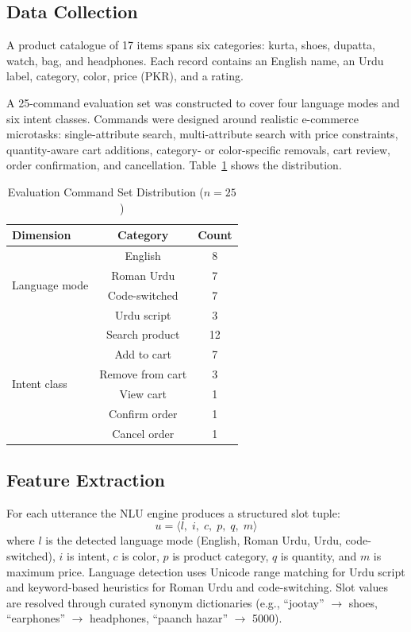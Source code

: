 \documentclass[conference]{IEEEtran}
\begin{document}
\subsection{Data Collection}

A product catalogue of 17 items spans six categories: kurta, shoes,
dupatta, watch, bag, and headphones. Each record contains an English
name, an Urdu label, category, color, price (PKR), and a rating.

A 25-command evaluation set was constructed to cover four language
modes and six intent classes. Commands were designed around realistic
e-commerce microtasks: single-attribute search, multi-attribute search
with price constraints, quantity-aware cart additions, category- or
color-specific removals, cart review, order confirmation, and
cancellation. Table~\ref{tab:commands} shows the distribution.

\begin{table}[t]
\caption{Evaluation Command Set Distribution ($n=25$)}
\label{tab:commands}
\centering
\renewcommand{\arraystretch}{1.1}
\begin{tabular}{lcc}
\toprule
\textbf{Dimension} & \textbf{Category} & \textbf{Count} \\
\midrule
\multirow{4}{*}{Language mode}
  & English               & 8  \\
  & Roman Urdu            & 7  \\
  & Code-switched         & 7  \\
  & Urdu script           & 3  \\
\midrule
\multirow{6}{*}{Intent class}
  & Search product        & 12 \\
  & Add to cart           & 7  \\
  & Remove from cart      & 3  \\
  & View cart             & 1  \\
  & Confirm order         & 1  \\
  & Cancel order          & 1  \\
\bottomrule
\end{tabular}
\end{table}

\subsection{Feature Extraction}

For each utterance the NLU engine produces a structured slot tuple:
\begin{equation}
  u = \langle l,\; i,\; c,\; p,\; q,\; m \rangle
\end{equation}
where $l$ is the detected language mode (English, Roman Urdu, Urdu,
code-switched), $i$ is intent, $c$ is color, $p$ is product category,
$q$ is quantity, and $m$ is maximum price. Language detection uses
Unicode range matching for Urdu script and keyword-based heuristics for
Roman Urdu and code-switching. Slot values are resolved through curated
synonym dictionaries (e.g., ``jootay'' $\to$ shoes, ``earphones'' $\to$
headphones, ``paanch hazar'' $\to$ 5000).
\end{document}
